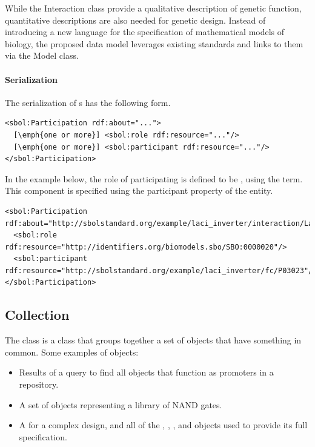 

While the Interaction class provide a qualitative description of genetic function, quantitative descriptions are also needed for genetic design. Instead of introducing a new language for the specification of mathematical models of biology, the proposed data model leverages existing standards and links to them via the Model class. 

\paragraph{Serialization}

The serialization of s has the following form.
\begin{lstlisting}
<sbol:Participation rdf:about="...">
  [\emph{one or more}] <sbol:role rdf:resource="..."/>
  [\emph{one or more}] <sbol:participant rdf:resource="..."/>
</sbol:Participation>
\end{lstlisting}

In the example below, the role of participating  is defined to be , using the  term. This component is specified using the participant property of the  entity.
\begin{lstlisting}
<sbol:Participation rdf:about="http://sbolstandard.org/example/laci_inverter/interaction/LacI_pLacI/participation/P03023">
  <sbol:role rdf:resource="http://identifiers.org/biomodels.sbo/SBO:0000020"/>
  <sbol:participant rdf:resource="http://sbolstandard.org/example/laci_inverter/fc/P03023"/>
</sbol:Participation>
\end{lstlisting}

\subsection {Collection}
\label{sec:Collection}
The  class is a class that groups together a set of  objects that have something in common. 
Some examples of  objects:
\begin{itemize}
\item Results of a query to find all  objects that function as promoters in a repository.
\item A set of  objects representing a library of NAND gates.
\item A  for a complex design, and all of the , , , and  objects used to provide its full specification.
\end{itemize}

